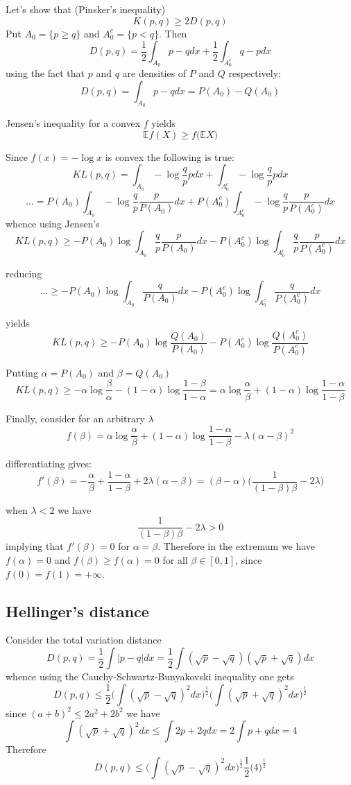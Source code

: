 \documentclass[a4paper]{article}
\newcommand{\Ex}{\mathbb{E}}
\begin{document}
Let's show that (Pinsker's inequality)
\[K(p,q)\geq 2 D(p,q)\]
Put $A_0 = \{ p \geq q \}$ and $A_0^c = \{p < q\}$. Then 
\[D(p,q) = \frac{1}{2}\int_{A_0} p-q dx + \frac{1}{2}\int_{A_0^c} q - p dx \]
using the fact that $p$ and $q$ are densities of $P$ and $Q$ respectively:
\[D(p,q) = \int_{A_0} p-q dx = P(A_0) - Q(A_0)\]

Jensen's inequality for a convex $f$ yields
\[\Ex f(X) \geq f\big(\Ex X\big)\]

Since $f(x) = -\log x$ is convex the following is true:
\[KL(p,q) = \int_{A_0} -\log\frac{q}{p} p dx + \int_{A_0^c} -\log\frac{q}{p} p dx \]
\[\ldots = P(A_0) \int_{A_0} -\log\frac{q}{p} \frac{p}{P(A_0)} dx + P(A_0^c) \int_{A_0^c} -\log\frac{q}{p} \frac{p}{P(A_0^c)} dx \]
whence using Jensen's
\[KL(p,q) \geq  -P(A_0) \log \int_{A_0}\frac{q}{p} \frac{p}{P(A_0)} dx - P(A_0^c) \log \int_{A_0^c} \frac{q}{p} \frac{p}{P(A_0^c)} dx\]

reducing
\[\ldots \geq -P(A_0) \log \int_{A_0}\frac{q}{P(A_0)} dx -P(A_0^c) \log \int_{A_0^c} \frac{q}{P(A_0^c)} dx \]

yields
\[KL(p,q) \geq -P(A_0) \log \frac{Q(A_0)}{P(A_0)} -P(A_0^c) \log \frac{Q(A_0^c)}{P(A_0^c)} \]

Putting $\alpha = P(A_0)$ and $\beta = Q(A_0)$
\[KL(p,q) \geq -\alpha \log \frac{\beta}{\alpha} -(1-\alpha) \log \frac{1-\beta}{1-\alpha} = \alpha \log \frac{\alpha}{\beta} + (1-\alpha) \log \frac{1-\alpha}{1-\beta} \]

Finally, consider for an arbitrary $\lambda$
\[f(\beta) = \alpha \log \frac{\alpha}{\beta} + (1-\alpha) \log \frac{1-\alpha}{1-\beta} - \lambda (\alpha - \beta)^2\]

differentiating gives:
\[f'(\beta) = -\frac{\alpha}{\beta} + \frac{1-\alpha}{1-\beta} + 2\lambda (\alpha - \beta) = (\beta - \alpha)\Big(\frac{1}{(1-\beta)\beta} - 2\lambda\Big)\]

when $\lambda < 2$ we have
\[\frac{1}{(1-\beta)\beta} - 2\lambda > 0\]
implying that $f'(\beta) = 0$ for $\alpha=\beta$.
Therefore in the extremum we have $f(\alpha) = 0$ and $f(\beta)\geq f(\alpha) = 0$ for all $\beta\in [0,1]$, since $f(0)=f(1)=+\infty$.

\subsection{Hellinger's distance} %
\label{sub:hellinger_s_distance}

Consider the total variation distance
\[D(p,q) = \frac{1}{2}\int |p-q| dx = \frac{1}{2}\int (\sqrt{p}-\sqrt{q})(\sqrt{p}+\sqrt{q}) dx\]
whence using the Cauchy-Schwartz-Bunyakovski inequality one gets
\[D(p,q) \leq \frac{1}{2}\Big(\int (\sqrt{p}-\sqrt{q})^2dx\Big)^\frac{1}{2}\Big(\int (\sqrt{p}+\sqrt{q})^2dx\Big)^\frac{1}{2}\]
since $(a+b)^2\leq 2 a^2 + 2 b^2$ we have
\[\int (\sqrt{p}+\sqrt{q})^2dx \leq \int 2p+2q dx = 2 \int p+q dx = 4\]
Therefore
\[D(p,q) \leq \Big(\int (\sqrt{p}-\sqrt{q})^2dx\Big)^\frac{1}{2} \frac{1}{2}\Big(4\Big)^\frac{1}{2}\]
\end{document}
